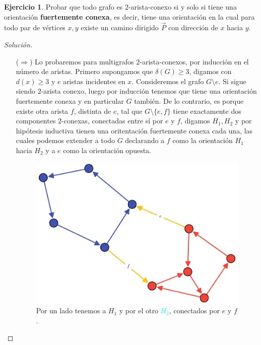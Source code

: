 \documentclass[12pt]{report}
\theoremstyle{plain}
\theoremstyle{definition}
\newtheorem{exercise}[theorem]{Ejercicio}
\newenvironment{solution}{\begin{proof}[Solución]}{\end{proof}}
\newcommand{\red}[1]{\textcolor{BrickRed}{#1}}
\newcommand{\blue}[1]{\textcolor{Cyan}{#1}}
\newcommand{\yellow}[1]{\textcolor{yellow!80!Black}{#1}} %
\begin{document}
\begin{exercise}\label{ejercicio:todo grafo es 2 arista conexo si y solo si tiene una orientacion fuertemente conexa}
Probar que todo grafo es $2$-arista-conexo si y solo si tiene una orientación \textbf{fuertemente conexa}, es
decir, tiene una orientación en la cual para todo par de vértices $x,y$ existe un camino dirigido $\overset{
\rightarrow}{P}$ con dirección de $x$ hacia $y$.
\end{exercise}
\begin{solution}
\begin{enumerate}
\item[($\Rightarrow$)] Lo probaremos para multigrafos $2$-arista-conexos, por inducción en el número de aristas.
Primero supongamos que $\delta (G) \geq 3$, digamos con $d(x) \geq 3$ y $e$ aristas incidentes en $x$.
Consideremos el grafo $G \setminus e$. Si sigue siendo $2$-arista conexo, luego por inducción tenemos que tiene
una orientación fuertemente conexa y en particular $G$ también. De lo contrario, es porque existe otra arista $f$, distinta de $e$, tal que $
G\setminus \{e,f\}$
tiene
exactamente dos componentes $2$-conexas, conectadas entre sí por $e$ y $f$, digamos $H_1,H_2$ y por hipótesis
inductiva
tienen una
oritentación
fuertemente conexa cada una, las cuales podemos extender a todo $G$ declarando a $f$ como la orientación $H_1$
hacia $H_2$ y a $e$ como la orientación opuesta.
\begin{figure}
\centering
\includegraphics{"./Editor de Grafos/Figuras/Ejercicios/Dibujo 1"}
\caption{Por un lado tenemos a \red{$H_1$} y por el otro \blue{$H_2$}, conectados por \yellow{$e$} y \yellow{$f$}.}
\end{figure}



\end{enumerate}
\end{solution}
\end{document}

